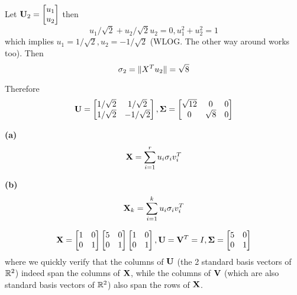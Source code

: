 \documentclass[a4paper, 12pt]{article}
\begin{document}
\begin{solution}
    Let $\mathbf{U}_2 = \begin{bmatrix}
            u_1 \\
            u_2
        \end{bmatrix}$ then \[
        u_1/\sqrt{2} + u_2/\sqrt{2}u_2 = 0, u_1^2 + u_2^2 = 1
    \]
    which implies $u_1 = 1/\sqrt{2}, u_2 = -1/\sqrt{2}$ (WLOG. The other way around works too). Then \[
        \sigma_2 = \lVert X^T u_2\rVert = \sqrt{8}
    \]

    Therefore
    \[
        \mathbf{U} = \begin{bmatrix}
            1/\sqrt{2} & 1/\sqrt{2}  \\
            1/\sqrt{2} & -1/\sqrt{2}
        \end{bmatrix}, \mathbf{\Sigma} = \begin{bmatrix}
            \sqrt{12} & 0        & 0 \\
            0         & \sqrt{8} & 0
        \end{bmatrix}
    \]
\end{solution}

\begin{problem} [Problem 3]
\end{problem}

\begin{solution}
    \textbf{(a)} \[
        \mathbf{X} = \sum_{i =1}^{r} u_i \sigma_i v_i^T
    \]

    \textbf{(b)}\[
        \mathbf{X}_k = \sum_{i =1}^{k} u_i \sigma_i v_i^T
    \]
\end{solution}
\begin{problem} [Problem 4]
\end{problem}
\begin{solution}
    \[
        \mathbf{X} = \begin{bmatrix}
            1 & 0 \\
            0 & 1
        \end{bmatrix}
        \begin{bmatrix}
            5 & 0 \\
            0 & 1
        \end{bmatrix}
        \begin{bmatrix}
            1 & 0 \\
            0 & 1
        \end{bmatrix}, \mathbf{U} = \mathbf{V}^T = I, \mathbf{\Sigma} = \begin{bmatrix}
            5 & 0 \\
            0 & 1
        \end{bmatrix}
    \]
    where we quickly verify that the columns of $\mathbf{U}$ (the 2 standard basis vectors of $\mathbb{R}^2$) indeed span the columns of $\mathbf{X}$, while the columns of $\mathbf{V}$ (which are also standard basis vectors of $\mathbb{R}^2$) also span the rows of $\mathbf{X}$.
\end{solution}
\end{document}
